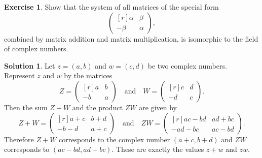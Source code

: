 \documentclass{article}
\theoremstyle{definition}
\newtheorem{exercise}{Exercise}
\newtheorem*{solution}{Solution}
\begin{document}
\begin{exercise}
    Show that the system of all matrices of the special form
    \[\begin{pmatrix*}[r]
        \alpha & \beta \\
        -\beta & \alpha
    \end{pmatrix*},\]
    combined by matrix addition and matrix multiplication, is isomorphic to the field of complex numbers.
\end{exercise}
\begin{solution}
    Let \(z=(a,b)\) and \(w=(c,d)\) be two complex numbers. Represent \(z\) and \(w\) by the matrices
    \[Z=
    \begin{pmatrix*}[r]
        a & b \\
        -b & a
    \end{pmatrix*}
    \quad\text{and}\quad
    W=
    \begin{pmatrix*}[r]
        c & d \\
        -d & c
    \end{pmatrix*}.\]
    Then the sum \(Z+W\) and the product \(ZW\) are given by
    \[Z+W=
    \begin{pmatrix*}[r]
        a+c & b+d \\
        -b-d & a+c
    \end{pmatrix*}
    \quad\text{and}\quad
    ZW=
    \begin{pmatrix*}[r]
        ac-bd & ad+bc \\
        -ad-bc & ac-bd
    \end{pmatrix*}.\]
    Therefore \(Z+W\) corresponds to the complex number \((a+c, b+d)\) and \(ZW\) corresponds to \((ac-bd, ad+bc)\). These are exactly the values \(z+w\) and \(zw\).
\end{solution}
\end{document}
